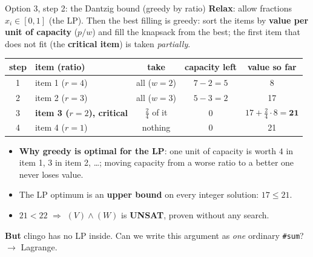 \documentclass[aspectratio=169,11pt]{beamer}
\begin{document}
\begin{frame}{Option 3, step 2: the Dantzig bound (greedy by ratio)}
\footnotesize
\textbf{Relax}: allow fractions $x_i \in [0,1]$ (the LP). Then the best filling is greedy: sort the items by \textbf{value per unit
of capacity} ($p/w$) and fill the knapsack from the best; the first item that does not fit (the \textbf{critical item})
is taken \emph{partially}.
\vspace{1mm}
\begin{center}
\begin{tabular}{clccc}\toprule
step & item (ratio) & take & capacity left & value so far\\\midrule
1 & item 1 ($r{=}4$) & all ($w{=}2$) & $7-2 = 5$ & 8\\
2 & item 2 ($r{=}3$) & all ($w{=}3$) & $5-3 = 2$ & 17\\
3 & \textbf{item 3 ($r{=}2$), critical} & $\frac{2}{4}$ of it & 0 & $17 + \frac24\cdot 8 = \mathbf{21}$\\
4 & item 4 ($r{=}1$) & nothing & 0 & 21\\\bottomrule
\end{tabular}
\end{center}
\begin{itemize}\setlength\itemsep{2pt}
\item \textbf{Why greedy is optimal for the LP}: one unit of capacity is worth $4$ in item 1, $3$ in item 2, \dots;
  moving capacity from a worse ratio to a better one never loses value.
\item The LP optimum is an \textbf{upper bound} on every integer solution: $17 \le 21$.
\item $21 < 22$ $\Rightarrow$ $(V)\wedge(W)$ is \textbf{UNSAT}, proven without any search.
\end{itemize}
\textbf{But} clingo has no LP inside. Can we write this argument as \emph{one} ordinary \texttt{\#sum}? $\to$ Lagrange.
\end{frame}
\end{document}
